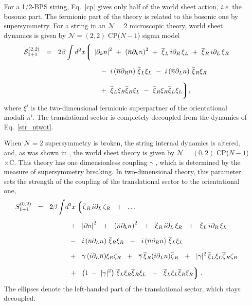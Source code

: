 \documentclass[12pt]{article}
\newcommand{\ntwo}{${\mathcal N}=2$ }
\newcommand{\ntwot}{${\mathcal N}= \left(2,2\right) $ }
\newcommand{\ntwoo}{${\mathcal N}= \left(0,2\right) $ }
\newcommand{\p}{\partial}
\newcommand{\ov}{\overline}
\newcommand{\mc}[1]{\mathcal{#1}}
\newcommand{\lgr}{\left\lgroup}
\newcommand{\rgr}{\right\rgroup}
\newcommand{\bxir}{\ov{\xi}{}_R}
\newcommand{\bxil}{\ov{\xi}{}_L}
\newcommand{\xir}{\xi_R}
\newcommand{\xil}{\xi_L}
\newcommand{\bzl}{\ov{\zeta}{}_L}
\newcommand{\bzr}{\ov{\zeta}{}_R}
\newcommand{\zr}{\zeta_R}
\newcommand{\zl}{\zeta_L}
\newcommand{\nbar}{\ov{n}}
\newcommand{\CPCn}{CP($N-1$)$\times$C}
\begin{document}
	For a 1/2-BPS string, Eq.~\eqref{cp} gives only half of the world sheet action, {\it i.e.} the bosonic part.
	The fermionic part of the theory is related to the bosonic one by supersymmetry.
	For a string in an \ntwo microscopic theory, world sheet dynamics is given 
	by \ntwot CP($N-1$) sigma model
\begin{align}
%
\notag
\mc{S}_{\rm 1+1}^{\rm (2,2)}  ~~=~~ 2\beta
	\int  d^2x
	\biggl\lgroup\; 
	&
	\left|\p_k n \right|^2  ~+~ \left(\ov{n}\p_k n\right)^2  
	~+~ \ov{\xi}{}_L\, i\p_R\, \xi_L  ~+~ \ov{\xi}{}_R\, i\p_L\,  \xi_R 
	\\[2mm]
%
\label{str_ntwot}
	&\;
	~~-~
	i \left(\nbar\p_R n\right)\, \bxil\xil ~-~ i \left(\nbar\p_Ln\right) \, \bxir\xir 
	\\[2mm]
%
\notag
	&\;
		~~+~
		\bxil \xir \bxir \xil ~-~ \bxir \xir \bxil \xil
	\biggr\rgroup ,
\end{align}
	where $ \xi^i $ is the two-dimensional fermionic superpartner of the orientational moduli $ n^l $.
	The translational sector is completely decoupled from the dynamics of Eq.~\eqref{str_ntwot}.

	When \ntwo supersymmetry is broken, the string internal dynamics is altered, and, as was shown
	in \cite{Edalati}, the world sheet theory is given by \ntwoo \CPCn.
	This theory has one dimensionless coupling $ \gamma $ \cite{SYhet,BSYhet}, which is determined by the
	measure of supersymmetry breaking.
	In two-dimensional theory, this parameter sets the strength of the coupling of the translational
	sector to the orientational one,
\begin{align}
%
\notag
S_{1+1}^{(0,2)} ~~=~~ 2\beta
	\int & d^2 x 
\lgr
	\bzr\, i\p_L\, \zr ~~+~~ \dots 
\right.
	\\[2mm]
%
\notag
	&
	\;\;
	+~~
	\left|\p n\right|^2 ~~+~~ \left(\ov{n}\p_k n\right)^2 ~~+~~
	\bxir \, i\p_L \, \xir  ~~+~~ \bxil \, i\p_R \, \xil 
	\\[2mm]
%
\label{world02}
	&
	\;\;
	-~~
	i \left(\ov{n}\p_L n\right)\, \bxir \xir ~~-~~ 
	i \left(\ov{n}\p_R n\right)\, \bxil \xil  
	\\[2mm]
%
\notag
	&
	\;\;
	+~~
	\gamma\, (i\p_L\nbar) \xir\zr ~~+~~ \ov{\gamma}\, \bxir (i\p_L n) \bzr ~~+~~
	|\gamma|^2\, \bxil\xil \bzr\zr  
	\\[2mm]
%
\notag
	&
	\;\;
\left.
	+~~ 
	\left( 1 \;-\; |\gamma|^2 \right)\, \bxil\xir \bxir\xil  
	~~-~~ \bxil\xil \bxir\xir
\rgr .
\end{align}
	The ellipses denote the left-handed part of the translational sector, which stays decoupled.
\end{document}
